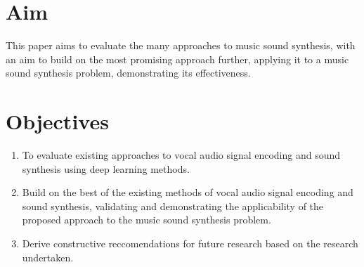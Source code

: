 \section{Aim}

This paper aims to evaluate the many approaches to music sound synthesis, with an aim to build on the most promising approach further, applying it to a music sound synthesis problem, demonstrating its effectiveness.

\section{Objectives}

\begin{enumerate}
    \item To evaluate existing approaches to vocal audio signal encoding and sound synthesis using deep learning methods.
    \item Build on the best of the existing methods of vocal audio signal encoding and sound synthesis, validating and demonstrating the applicability of the proposed approach to the music sound synthesis problem.
    \item Derive constructive reccomendations for future research based on the research undertaken.
\end{enumerate}